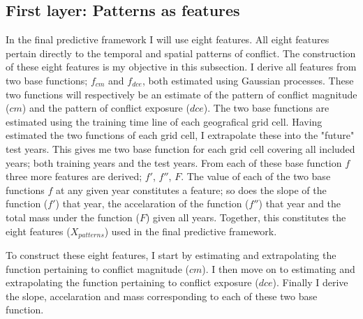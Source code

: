\documentclass[a4paper]{article}
\begin{document}

\subsection{First layer: Patterns as features}


In the final predictive framework I will use eight features. All eight features pertain directly to the temporal and spatial patterns of conflict. The construction of these eight features is my objective in this subsection. I derive all features from two base functions; $f_{cm}$ and $f_{dce}$, both estimated using Gaussian processes. These two functions will respectively be an estimate of the pattern of conflict magnitude ($cm$) and the pattern of conflict exposure ($dce$). The two base functions are estimated using the training time line of each geografical grid cell. Having estimated the two functions of each grid cell, I extrapolate these into the "future" test years. This gives me two base function for each grid cell covering all included years; both training years and the test years. From each of these base function $f$ three more features are derived; $f'$, $f''$, $F$. The value of each of the two base functions $f$ at any given year constitutes a feature; so does the slope of the function ($f'$) that year, the accelaration of the function ($f''$) that year and the total mass under the function ($F$) given all years. Together, this constitutes the eight features ($X_{patterns}$) used in the final predictive framework.\par 

To construct these eight features, I start by estimating and extrapolating the function pertaining to conflict magnitude ($cm$). I then move on to estimating and extrapolating the function pertaining to conflict exposure ($dce$). Finally I derive the slope, accelaration and mass corresponding to each of these two base function.\par
\end{document}
